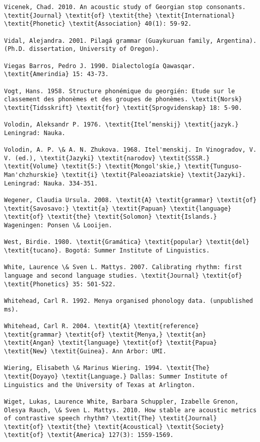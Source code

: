 \begin{verbatim}
Vicenek, Chad. 2010. An acoustic study of Georgian stop consonants. \textit{Journal} \textit{of} \textit{the} \textit{International} \textit{Phonetic} \textit{Association} 40(1): 59-92.

Vidal, Alejandra. 2001. Pilagá grammar (Guaykuruan family, Argentina). (Ph.D. dissertation, University of Oregon).

Viegas Barros, Pedro J. 1990. Dialectología Qawasqar. \textit{Amerindia} 15: 43-73.

Vogt, Hans. 1958. Structure phonémique du georgién: Etude sur le classement des phonèmes et des groupes de phonèmes. \textit{Norsk} \textit{Tidsskrift} \textit{for} \textit{Sprogvidenskap} 18: 5-90.

Volodin, Aleksandr P. 1976. \textit{Itel’menskij} \textit{jazyk.} Leningrad: Nauka. 

Volodin, A. P. \& A. N. Zhukova. 1968. Itel'menskij. In Vinogradov, V. V. (ed.), \textit{Jazyki} \textit{narodov} \textit{SSSR.} \textit{Volume} \textit{5:} \textit{Mongol'skie,} \textit{Tunguso-Man'chzhurskie} \textit{i} \textit{Paleoaziatskie} \textit{Jazyki}. Leningrad: Nauka. 334-351.

Wegener, Claudia Ursula. 2008. \textit{A} \textit{grammar} \textit{of} \textit{Savosavo:} \textit{a} \textit{Papuan} \textit{language} \textit{of} \textit{the} \textit{Solomon} \textit{Islands.} Wageningen: Ponsen \& Looijen.

West, Birdie. 1980. \textit{Gramática} \textit{popular} \textit{del} \textit{tucano}. Bogotá: Summer Institute of Linguistics.

White, Laurence \& Sven L. Mattys. 2007. Calibrating rhythm: first language and second language studies. \textit{Journal} \textit{of} \textit{Phonetics} 35: 501-522.

Whitehead, Carl R. 1992. Menya organised phonology data. (unpublished ms).

Whitehead, Carl R. 2004. \textit{A} \textit{reference} \textit{grammar} \textit{of} \textit{Menya,} \textit{an} \textit{Angan} \textit{language} \textit{of} \textit{Papua} \textit{New} \textit{Guinea}. Ann Arbor: UMI.

Wiering, Elisabeth \& Marinus Wiering. 1994. \textit{The} \textit{Doyayo} \textit{Language.} Dallas: Summer Institute of Linguistics and the University of Texas at Arlington.

Wiget, Lukas, Laurence White, Barbara Schuppler, Izabelle Grenon, Olesya Rauch, \& Sven L. Mattys. 2010. How stable are acoustic metrics of contrastive speech rhythm? \textit{The} \textit{Journal} \textit{of} \textit{the} \textit{Acoustical} \textit{Society} \textit{of} \textit{America} 127(3): 1559-1569.


\end{verbatim}

